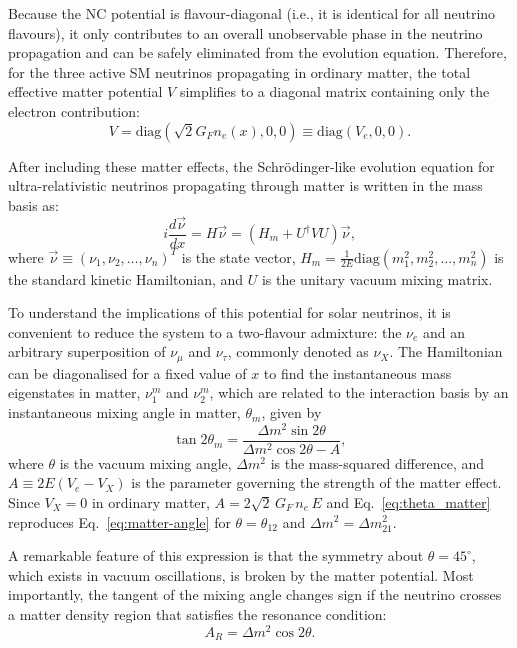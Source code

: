 Because the \ac{NC} potential is flavour-diagonal (i.e., it is identical for all neutrino flavours), it only contributes to an overall unobservable phase in the neutrino propagation and can be safely eliminated from the evolution equation. Therefore, for the three active \ac{SM} neutrinos propagating in ordinary matter, the total effective matter potential $V$ simplifies to a diagonal matrix containing only the electron contribution:
\begin{equation}
    \label{eq:matter_potential_matrix}
    V = \text{diag}(\sqrt{2}G_F n_e(x), 0, 0) \equiv \text{diag}(V_e, 0, 0).
\end{equation}

After including these matter effects, the Schrödinger-like evolution equation for ultra-relativistic neutrinos propagating through matter is written in the mass basis as:
\begin{equation}
    \label{eq:evolution_equation}
    i\frac{d\vec{\nu}}{dx} = H\vec{\nu} = \left( H_m + U^{\dagger} V U \right) \vec{\nu},
\end{equation}
where $\vec{\nu} \equiv (\nu_1, \nu_2, \dots, \nu_n)^T$ is the state vector, $H_m = \frac{1}{2E} \text{diag}(m_1^2, m_2^2, \dots, m_n^2)$ is the standard kinetic Hamiltonian, and $U$ is the unitary vacuum mixing matrix.

To understand the implications of this potential for solar neutrinos, it is convenient to reduce the system to a two-flavour admixture: the $\nu_e$ and an arbitrary superposition of $\nu_\mu$ and $\nu_\tau$, commonly denoted as $\nu_X$. The Hamiltonian can be diagonalised for a fixed value of $x$ to find the instantaneous mass eigenstates in matter, $\nu_1^m$ and $\nu_2^m$, which are related to the interaction basis by an instantaneous mixing angle in matter, $\theta_m$, given by
\begin{equation}
    \label{eq:theta_matter}
    \tan 2\theta_m = \frac{\Delta m^2 \sin 2\theta}{\Delta m^2 \cos 2\theta - A},
\end{equation}
where $\theta$ is the vacuum mixing angle, $\Delta m^2$ is the mass-squared difference, and $A \equiv 2E(V_e - V_X)$ is the parameter governing the strength of the matter effect. Since $V_X = 0$ in ordinary matter, $A = 2\sqrt{2}\,G_F\,n_e\,E$ and Eq.~\ref{eq:theta_matter} reproduces Eq.~\ref{eq:matter-angle} for $\theta = \theta_{12}$ and $\Delta m^2 = \Delta m^2_{21}$.

A remarkable feature of this expression is that the symmetry about $\theta = 45^\circ$, which exists in vacuum oscillations, is broken by the matter potential. Most importantly, the tangent of the mixing angle changes sign if the neutrino crosses a matter density region that satisfies the resonance condition:
\begin{equation}
    \label{eq:resonance_condition}
    A_R = \Delta m^2 \cos 2\theta.
\end{equation}

